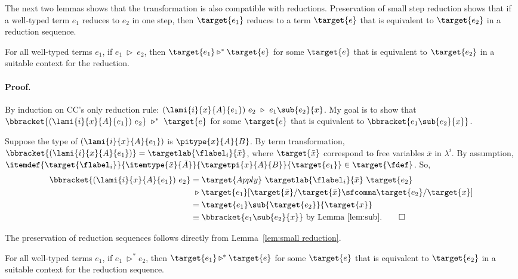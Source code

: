 The next two lemmas shows that the transformation is also compatible with reductions. Preservation of small step reduction shows that if a well-typed term $e_1$ reduces to $e_2$ in one step, then $\target{e_1}$ reduces to a term $\target{e}$ that is equivalent to $\target{e_2}$ in a reduction sequence.

\begin{lemma} For all well-typed terms $e_1$, if $e_1\ \triangleright\ e_2$, then $\target{e_1} \triangleright^* \target{e}$ for some $\target{e}$ that is equivalent to $\target{e_2}$ in a suitable context for the reduction.
\paragraph{Proof.} By induction on CC's only reduction rule: $(\lami{i}{x}{A}{e_1})\ e_2\ \triangleright\ e_1\sub{e_2}{x}$. My goal is to show that $\bbracket{(\lami{i}{x}{A}{e_1})\ e_2}\ \triangleright^*\ \target{e}$ for some $\target{e}$ that is equivalent to $\bbracket{e_1\sub{e_2}{x}}$.

Suppose the type of $(\lami{i}{x}{A}{e_1})$ is $\pitype{x}{A}{B}$. By term transformation, $\bbracket{(\lami{i}{x}{A}{e_1})} = \targetlab{\flabel_i}{\bar{x}}$, where $\target{\bar{x}}$ correspond to free variables $\bar{x}$ in $\lambda^i$. By assumption, $\itemdef{\target{\flabel_i}}{\itemtype{\bar{x}}{\bar{A}}}{\targetpi{x}{A}{B}}{\target{e_1}} \in \target{\fdef}$. So,
\begin{align*}
\bbracket{(\lami{i}{x}{A}{e_1})\ e_2} &= \target{Apply}\ \targetlab{\flabel_i}{\bar{x}}\ \target{e_2}\\
&\ \triangleright \target{e_1}[\target{\bar{x}}\slash\target{\bar{x}} \sfcomma \target{e_2}\slash\target{x}]\\
&= \target{e_1}\sub{\target{e_2}}{\target{x}}\\
&\equiv \bbracket{e_1\sub{e_2}{x}} \text{ by Lemma \ref{lem:sub}.} \qed
\end{align*}
\label{lem:small reduction}
\end{lemma}

The preservation of reduction sequences follows directly from Lemma~\ref{lem:small reduction}. 

\begin{lemma} For all well-typed terms $e_1$, if $e_1\ \triangleright^* e_2$, then $\target{e_1} \triangleright^* \target{e}$ for some $\target{e}$ that is equivalent to $\target{e_2}$ in a suitable context for the reduction sequence.
\label{lem:reduction sequence}
\end{lemma}

